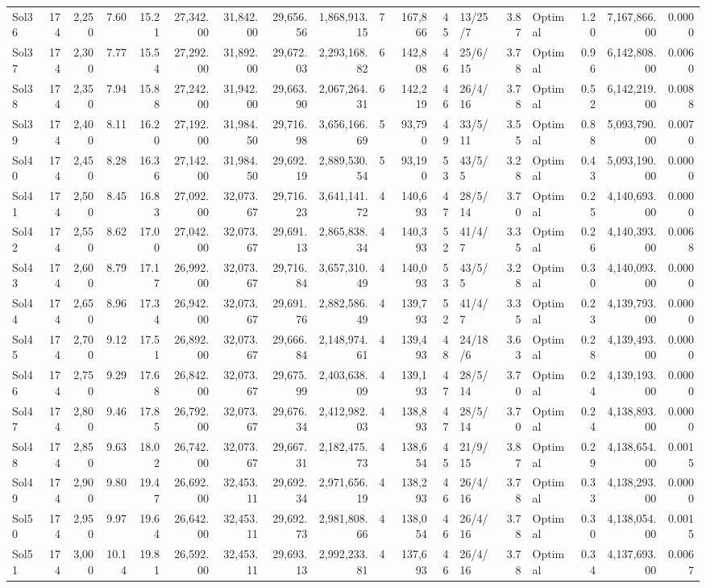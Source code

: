 \documentclass[a4paper]{article}
\begin{document}
{\begin{longtable}{lrrrrrrrrrrrlrlrrr}
Sol36&174&2,250& 7.60&15.21&27,342.00&31,842.00&29,656.56&1,868,913.15&7&167,866&45&13/25/7& 3.87&Optimal& 1.20&7,167,866.00&0.0000\\ 
Sol37&174&2,300& 7.77&15.54&27,292.00&31,892.00&29,672.03&2,293,168.82&6&142,808&46&25/6/15& 3.78&Optimal& 0.96&6,142,808.00&0.0060\\ 
Sol38&174&2,350& 7.94&15.88&27,242.00&31,942.00&29,663.90&2,067,264.31&6&142,219&46&26/4/16& 3.78&Optimal& 0.52&6,142,219.00&0.0088\\ 
Sol39&174&2,400& 8.11&16.20&27,192.00&31,984.50&29,716.98&3,656,166.69&5&93,790&49&33/5/11& 3.55&Optimal& 0.88&5,093,790.00&0.0070\\ 
Sol40&174&2,450& 8.28&16.36&27,142.00&31,984.50&29,692.19&2,889,530.54&5&93,190&53&43/5/5& 3.28&Optimal& 0.43&5,093,190.00&0.0000\\ 
Sol41&174&2,500& 8.45&16.83&27,092.00&32,073.67&29,716.23&3,641,141.72&4&140,693&47&28/5/14& 3.70&Optimal& 0.25&4,140,693.00&0.0000\\ 
Sol42&174&2,550& 8.62&17.00&27,042.00&32,073.67&29,691.13&2,865,838.34&4&140,393&52&41/4/7& 3.35&Optimal& 0.26&4,140,393.00&0.0068\\ 
Sol43&174&2,600& 8.79&17.17&26,992.00&32,073.67&29,716.84&3,657,310.49&4&140,093&53&43/5/5& 3.28&Optimal& 0.30&4,140,093.00&0.0000\\ 
Sol44&174&2,650& 8.96&17.34&26,942.00&32,073.67&29,691.76&2,882,586.49&4&139,793&52&41/4/7& 3.35&Optimal& 0.23&4,139,793.00&0.0000\\ 
Sol45&174&2,700& 9.12&17.51&26,892.00&32,073.67&29,666.84&2,148,974.61&4&139,493&48&24/18/6& 3.63&Optimal& 0.28&4,139,493.00&0.0000\\ 
Sol46&174&2,750& 9.29&17.68&26,842.00&32,073.67&29,675.99&2,403,638.09&4&139,193&47&28/5/14& 3.70&Optimal& 0.24&4,139,193.00&0.0000\\ 
Sol47&174&2,800& 9.46&17.85&26,792.00&32,073.67&29,676.34&2,412,982.03&4&138,893&47&28/5/14& 3.70&Optimal& 0.24&4,138,893.00&0.0000\\ 
Sol48&174&2,850& 9.63&18.02&26,742.00&32,073.67&29,667.31&2,182,475.73&4&138,654&45&21/9/15& 3.87&Optimal& 0.29&4,138,654.00&0.0015\\ 
Sol49&174&2,900& 9.80&19.47&26,692.00&32,453.11&29,692.34&2,971,656.19&4&138,293&46&26/4/16& 3.78&Optimal& 0.33&4,138,293.00&0.0000\\ 
Sol50&174&2,950& 9.97&19.64&26,642.00&32,453.11&29,692.73&2,981,808.66&4&138,054&46&26/4/16& 3.78&Optimal& 0.30&4,138,054.00&0.0015\\ 
Sol51&174&3,000&10.14&19.81&26,592.00&32,453.11&29,693.13&2,992,233.81&4&137,693&46&26/4/16& 3.78&Optimal& 0.34&4,137,693.00&0.0067\\ 
\end{longtable}

}
\end{document}
